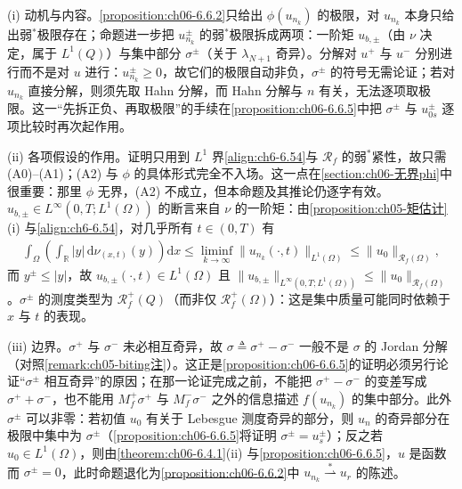 \documentclass[../../main.tex]{subfiles}%
\begin{document}
\begin{remark}\label{remark:ch06-6.6.3}
(i) 动机与内容。\cref{proposition:ch06-6.6.2}只给出 $\phi(u_{n_k})$ 的极限，对 $u_{n_k}$ 本身只给出弱$^*$极限存在；命题进一步把 $u^\pm_{n_k}$ 的弱$^*$极限拆成两项：一阶矩 $u_{b,\pm}$（由 $\nu$ 决定，属于 $L^1(Q)$）与集中部分 $\sigma^\pm$（关于 $\lambda_{N+1}$ 奇异）。分解对 $u^+$ 与 $u^-$ 分别进行而不是对 $u$ 进行：$u^\pm_{n_k}\geqslant0$，故它们的极限自动非负，$\sigma^\pm$ 的符号无需论证；若对 $u_{n_k}$ 直接分解，则须先取 Hahn 分解，而 Hahn 分解与 $n$ 有关，无法逐项取极限。这一“先拆正负、再取极限”的手续在\cref{proposition:ch06-6.6.5}中把 $\sigma^\pm$ 与 $u^\pm_{0s}$ 逐项比较时再次起作用。

(ii) 各项假设的作用。证明只用到 $L^1$ 界\eqref{align:ch6-6.54}与 $\mathscr{R}_f$ 的弱$^*$紧性，故只需 (A0)--(A1)；(A2) 与 $\phi$ 的具体形式完全不入场。这一点在\cref{section:ch06-无界phi}中很重要：那里 $\phi$ 无界，(A2) 不成立，但本命题及其推论仍逐字有效。$u_{b,\pm}\in L^\infty(0,T;L^1(\Omega))$ 的断言来自 $\nu$ 的一阶矩：由\cref{proposition:ch05-矩估计}(i) 与\eqref{align:ch6-6.54}，对几乎所有 $t\in(0,T)$ 有
\begin{align*}
\int_\Omega\left(\int_\mathbb{R}|y|\,\mathrm{d}\nu_{(x,t)}(y)\right)\mathrm{d}x
\leqslant\liminf_{k\to\infty}\|u_{n_k}(\cdot,t)\|_{L^1(\Omega)}
\leqslant\|u_0\|_{\mathscr{R}_f(\Omega)},
\end{align*}
而 $y^\pm\leqslant|y|$，故 $u_{b,\pm}(\cdot,t)\in L^1(\Omega)$ 且 $\|u_{b,\pm}\|_{L^\infty(0,T;L^1(\Omega))}\leqslant\|u_0\|_{\mathscr{R}_f(\Omega)}$。$\sigma^\pm$ 的测度类型为 $\mathscr{R}^+_f(Q)$（而非仅 $\mathscr{R}^+_f(\Omega)$）：这是集中质量可能同时依赖于 $x$ 与 $t$ 的表现。

(iii) 边界。$\sigma^+$ 与 $\sigma^-$ 未必相互奇异，故 $\sigma\triangleq\sigma^+-\sigma^-$ 一般不是 $\sigma$ 的 Jordan 分解（对照\cref{remark:ch05-biting注}）。这正是\cref{proposition:ch06-6.6.5}的证明必须另行论证“$\sigma^\pm$ 相互奇异”的原因；在那一论证完成之前，不能把 $\sigma^+-\sigma^-$ 的变差写成 $\sigma^++\sigma^-$，也不能用 $M^+_f\sigma^+$ 与 $M^-_f\sigma^-$ 之外的信息描述 $f(u_{n_k})$ 的集中部分。此外 $\sigma^\pm$ 可以非零：若初值 $u_0$ 有关于 Lebesgue 测度奇异的部分，则 $u_n$ 的奇异部分在极限中集中为 $\sigma^\pm$（\cref{proposition:ch06-6.6.5}将证明 $\sigma^\pm=u^\pm_s$）；反之若 $u_0\in L^1(\Omega)$，则由\cref{theorem:ch06-6.4.1}(ii) 与\cref{proposition:ch06-6.6.5}，$u$ 是函数而 $\sigma^\pm=0$，此时命题退化为\cref{proposition:ch06-6.6.2}中 $u_{n_k}\stackrel{*}{\rightharpoonup}u_r$ 的陈述。
\end{remark}
\end{document}
